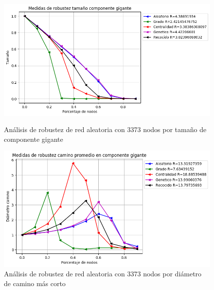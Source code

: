 \begin{figure}[!htb]
    \begin{minipage}{0.48\textwidth}
        \centering
        \includegraphics[scale=0.4]{CapituloAAnexos/imagenesAnexoC/Robustez/grafica_GC20180505_190832Random3373Nodes5978}
        \caption{Análisis de robustez de red aleatoria con 3373 nodos por tamaño de componente gigante}
    \end{minipage}\hfill
   \begin{minipage}{0.48\textwidth}
         \centering
       \includegraphics[scale=0.4]{CapituloAAnexos/imagenesAnexoC/Robustez/grafica_APL20180505_190832Random3373Nodes5978}
        \caption{Análisis de robustez de red aleatoria con 3373 nodos por diámetro de camino más corto}
    \end{minipage}
\end{figure}

